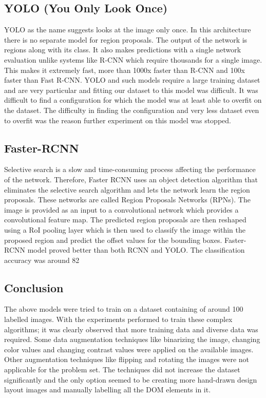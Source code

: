     \subsection{YOLO (You Only Look Once)}
      YOLO as the name suggests looks at the image only once. In this architecture there is no separate model for region proposals. The output of the network is regions along with its class. It also makes predictions with a single network evaluation unlike systems like R-CNN which require thousands for a single image. This makes it extremely fast, more than 1000x faster than R-CNN and 100x faster than Fast R-CNN.
      YOLO and such models require a large training dataset and are very particular and fitting our dataset to this model was difficult. It was difficult to find a configuration for which the model was at least able to overfit on the dataset. The difficulty in finding the configuration and very less dataset even to overfit was the reason further experiment on this model was stopped.

    \subsection{Faster-RCNN}
      Selective search is a slow and time-consuming process affecting the performance of the network. Therefore, Faster RCNN uses an object detection algorithm that eliminates the selective search algorithm and lets the network learn the region proposals. These networks are called Region Proposals Networks (RPNs). The image is provided as an input to a convolutional network which provides a convolutional feature map. The predicted region proposals are then reshaped using a RoI pooling layer which is then used to classify the image within the proposed region and predict the offset values for the bounding boxes.
      Faster-RCNN model proved better than both RCNN and YOLO. The classification accuracy was around 82%

    \subsection{Conclusion}
      The above models were tried to train on a dataset containing of around 100 labelled images. With the experiments performed to train these complex algorithms; it was clearly observed that more training data and diverse data was required.
      Some data augmentation techniques like binarizing the image, changing color values and changing contrast values were applied on the available images. Other augmentation techniques like flipping and rotating the images were not applicable for the problem set.
      The techniques did not increase the dataset significantly and the only option seemed to be creating more hand-drawn design layout images and manually labelling all the DOM elements in it.

